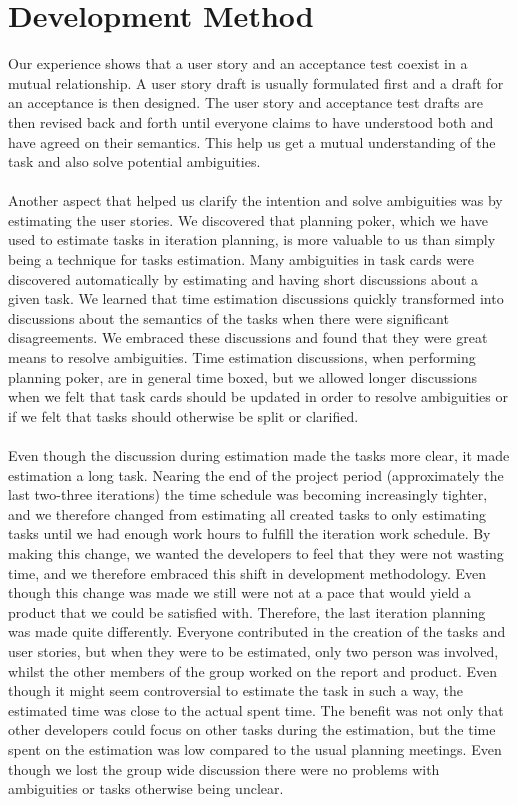 
\section{Development Method}
Our experience shows that a user story and an acceptance test coexist in a mutual relationship. A user story draft is usually formulated first and a draft for an acceptance is then designed. The user story and acceptance test drafts are then revised back and forth until everyone claims to have understood both and have agreed on their semantics. This help us get a mutual understanding of the task and also solve potential ambiguities. 
\\\\
Another aspect that helped us clarify the intention and solve ambiguities was by estimating the user stories. 
We discovered that planning poker, which we have used to estimate tasks in iteration planning, is more valuable to us than simply being a technique for tasks estimation. Many ambiguities in task cards were discovered automatically by estimating and having short discussions about a given task. We learned that time estimation discussions quickly transformed into discussions about the semantics of the tasks when there were significant disagreements. We embraced these discussions and found that they were great means to resolve ambiguities. Time estimation discussions, when performing planning poker, are in general time boxed, but we allowed longer discussions when we felt that task cards should be updated in order to resolve ambiguities or if we felt that tasks should otherwise be split or clarified.
\\\\
Even though the discussion during estimation made the tasks more clear, it made estimation a long task. Nearing the end of the project period (approximately the last two-three iterations) the time schedule was becoming increasingly tighter, and we therefore changed from estimating all created tasks to only estimating tasks until we had enough work hours to fulfill the iteration work schedule. By making this change, we wanted the developers to feel that they were not wasting time, and we therefore embraced this shift in development methodology. Even though this change was made we still were not at a pace that would yield a product that we could be satisfied with. Therefore, the last iteration planning was made quite differently. Everyone contributed in the creation of the tasks and user stories, but when they were to be estimated, only two person was involved, whilst the other members of the group worked on the report and product. Even though it might seem controversial to estimate the task in such a way, the estimated time was close to the actual spent time. The benefit was not only that other developers could focus on other tasks during the estimation, but the time spent on the estimation was low compared to the usual planning meetings. Even though we lost the group wide discussion there were no problems with ambiguities or tasks otherwise being unclear. 
